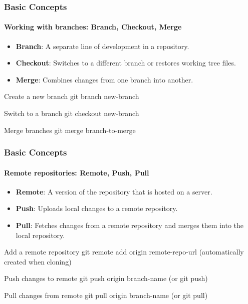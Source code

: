 \documentclass{beamer}
\begin{document}
\begin{frame}\frametitle{Basic Concepts}\framesubtitle{Working with branches: Branch, Checkout, Merge}
\begin{itemize}
	\item \textbf{Branch}: A separate line of development in a repository.
	\vspace{0.2cm}
	\item \textbf{Checkout}: Switches to a different branch or	 restores working tree files.
	\vspace{0.2cm}
	\item \textbf{Merge}: Combines changes from one branch into another.
\end{itemize}

\begin{alertblock}{Create a new branch}
git branch new-branch
\end{alertblock}

\begin{alertblock}{Switch to a branch}
git checkout new-branch
\end{alertblock}

\begin{alertblock}{Merge branches}
git merge branch-to-merge
\end{alertblock}

\end{frame}

\begin{frame}\frametitle{Basic Concepts}\framesubtitle{Remote repositories: Remote, Push, Pull}
\begin{itemize}
	\item \textbf{Remote}: A version of the repository that is hosted on a server.
	\vspace{0.2cm}
	\item \textbf{Push}: Uploads local changes to a remote repository.
	\vspace{0.2cm}
	\item \textbf{Pull}: Fetches changes from a remote repository and merges them into the local repository.
\end{itemize}

\begin{alertblock}{Add a remote repository}
git remote add origin remote-repo-url (automatically created when cloning)
\end{alertblock}

\begin{alertblock}{Push changes to remote}
git push origin branch-name (or git push)
\end{alertblock}

\begin{alertblock}{Pull changes from remote}
git pull origin branch-name (or git pull)
\end{alertblock}

\end{frame}
\end{document}
